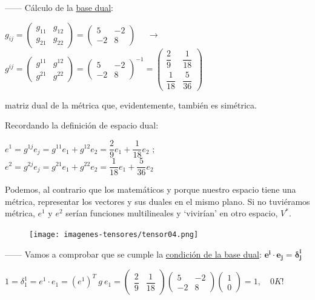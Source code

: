 ------ Cálculo de la \underline{base dual}:

$g_{ij}=\left( \begin{matrix} g_{11} & g_{12} \\ g_{21} & g_{22} \end{matrix} \right) = \left( \begin{matrix} 5&-2\\-2&8 \end{matrix} \right)$
$\quad \to \qquad$
$g^{ij}=\left( \begin{matrix} g^{11} & g^{12} \\ g^{21} & g^{22} \end{matrix} \right) = \left( \begin{matrix} 5&-2\\-2&8 \end{matrix} \right)^{-1}=
\left( \begin{matrix} \dfrac 2 9&\dfrac 1 {18}\\\dfrac 1 {18}&\dfrac 5{36} \end{matrix} \right)$

matriz dual de la métrica que, evidentemente, también es simétrica.

Recordando la definición de espacio dual:

$e^1=g^{1j}e_j=g^{11}e_1+g^{12}e_2=\dfrac 2 9 e_1+\dfrac 1 {18} e_2$
$;\qquad$
$e^2=g^{2j}e_j=g^{21}e_1+g^{22}e_2=\dfrac 1 {18} e_1+\dfrac 5 {36} e_2$

\begin{multicols}{2}
	Podemos, al contrario que los matemáticos y porque nuestro espacio tiene una métrica, representar los vectores y sus duales en el mismo plano. Si no tuviéramos métrica, $e^1 \text{ y } e^2$ serían funciones multilineales y `vivirían' en otro espacio, $V^*$.

	\begin{figure}[H]
		\centering
		\texttt{[image: imagenes-tensores/tensor04.png]}
	\end{figure}
\end{multicols}

------ Vamos a comprobar que se cumple la \underline{condición de la base dual}: $\boldsymbol{e^i \cdot e_j=\delta^i_j}$

$1=\delta^1_1=e^1\cdot e_1=(e^1)^T\ g \ e_1 = 
\left( \begin{matrix} \dfrac 2 9 & \dfrac 1 {18} \end{matrix} \right)
\left( \begin{matrix} 5&-2\\-2&8 \end{matrix} \right)
\left( \begin{matrix} 1 \\ 0 \end{matrix} \right) = 1,\quad 0K!$

